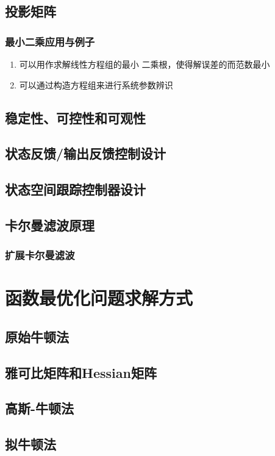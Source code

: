 \section{投影矩阵}

\subsection{最小二乘应用与例子}
\begin{enumerate}
  \item 可以用作求解线性方程组的最小
二乘根，使得解误差的而范数最小
  \item 可以通过构造方程组来进行系统参数辨识
\end{enumerate}
\section{稳定性、可控性和可观性}
\section{状态反馈/输出反馈控制设计}
\section{状态空间跟踪控制器设计}
\section{卡尔曼滤波原理}
\subsection{扩展卡尔曼滤波}




\chapter{函数最优化问题求解方式}
\section{原始牛顿法}
\section{雅可比矩阵和Hessian矩阵}
\section{高斯-牛顿法}
\section{拟牛顿法}
